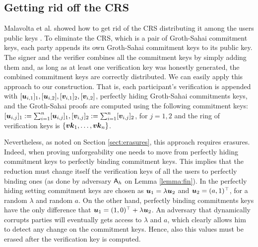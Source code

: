 \subsection{Getting rid off the CRS}
Malavolta et al. showed how to get rid of the CRS distributing it among the users public keys \cite{AC:MalSch17}. To eliminate the CRS, which is a pair of Groth-Sahai commitment keys, each party appends its own Groth-Sahai commitment keys to its public key. The signer and the verifier combines all the commitment keys by simply adding them and, as long as at least one verification key was honestly generated, the combined commitment keys are correctly distributed. We can easily apply this approach to our construction. That is, each participant's verification is appended with $[{\boldsymbol{u}}_{i,1}]_1,[{\boldsymbol{u}}_{i,2}],[{\boldsymbol{v}}_{i,1}]_2,[{\boldsymbol{v}}_{i,2}]$, perfectly hiding Groth-Sahai commitments keys, and the Groth-Sahai proofs are computed using the following commitment keys: $[{\boldsymbol{u}}_{i,j}]_1 :=\sum_{i=1}^n [{\boldsymbol{u}}_{i,j}]_1,[{\boldsymbol{v}}_{i,j}]_2 :=\sum_{i=1}^n [{\boldsymbol{v}}_{i,j}]_2$, for $j=1,2$ and the ring of verification keys is $\{{\boldsymbol{vk}}_1,\ldots,{\boldsymbol{vk}}_n\}$.

Nevertheless, as noted on Section \ref{sect:erasures}, this approach requires erasures. Indeed, when proving unforgeability one needs to move from perfectly hiding commitment keys to perfectly binding commitment keys. This implies that the reduction must change itself the verification keys of all the users to perfectly binding ones (as done by adversary $\mathsf{A}_h$ on Lemma \ref{lemma:fin}). In the perfectly hiding setting commitment keys are chosen as ${\boldsymbol{u}}_1 = \lambda{\boldsymbol{u}}_2$ and ${\boldsymbol{u}}_2 = (a,1)^\top$, for a random $\lambda$ and random $a$.  On the other hand, perfectly binding commitments keys have the only difference that ${\boldsymbol{u}}_1 = (1,0)^\top+\lambda{\boldsymbol{u}}_2$. An adversary that dynamically corrupts parties will eventually gets access to $\lambda$ and $a$, which clearly allows him to detect any change on the commitment keys. Hence, also this values must be erased after the verification key is computed.